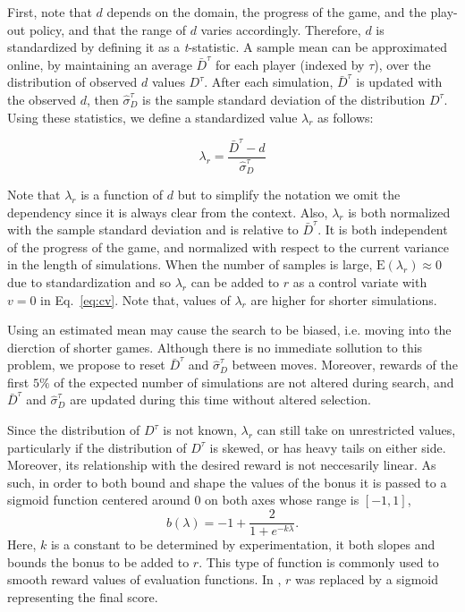 \documentclass{ecai2014}
\newcommand{\E}[1]{\mathrm{E}\left( #1 \right)}
\begin{document}
First, note that $d$ depends on the domain, the progress of the game, and the play-out policy, and that the range of $d$ varies accordingly. Therefore, $d$ is standardized by defining it as a \emph{t}-statistic. A sample mean can be approximated online, by maintaining an average $\bar{D}^\tau$ for each player (indexed by $\tau$), over the distribution of observed $d$ values $D^\tau$. After each simulation, $\bar{D}^\tau$ is updated with the observed $d$, then $\hat{\sigma}^\tau_D$ is the sample standard deviation of the distribution $D^\tau$. Using these statistics, we define a standardized value $\lambda_r$ as follows:

\begin{equation}
\lambda_r = \frac{\bar{D}^\tau - d}{\hat{\sigma}^\tau_D}
\label{eq:rb_norm}
\end{equation}

Note that $\lambda_r$ is a function of $d$ but to simplify the notation we omit the dependency since it is always clear from the context. Also, $\lambda_r$ is both normalized with the sample standard deviation and is relative to $\bar{D}^\tau$. It is both independent of the progress of the game, and normalized with respect to the current variance in the length of simulations. When the number of samples is large, $\E{\lambda_r} \approx 0$ due to standardization and so $\lambda_r$ can be added to $r$ as a control variate with $v = 0$ in Eq.~\ref{eq:cv}. Note that, values of $\lambda_r$ are higher for shorter simulations.

Using an estimated mean may cause the search to be biased, i.e. moving into the dierction of shorter games. Although there is no immediate sollution to this problem, we propose to reset $\bar{D}^\tau$ and $\hat{\sigma}^\tau_D$ between moves. Moreover, rewards of the first $5\%$ of the expected number of simulations are not altered during search, and $\bar{D}^\tau$ and $\hat{\sigma}^\tau_D$ are updated during this time without altered selection.

Since the distribution of $D^\tau$ is not known, $\lambda_r$ can still take on unrestricted values, particularly if the distribution of $D^\tau$ is skewed, or has heavy tails on either side. Moreover, its relationship with the desired reward is not neccesarily linear. As such, in order to both bound and shape the values of the bonus it is passed to a sigmoid function centered around $0$ on both axes whose range is $[-1,1]$,
\begin{equation}
b(\lambda)=-1+\frac{2}{1+e^{-k\lambda}}.
\label{eq:sigmoid}
\end{equation}
Here, $k$ is a constant to be determined by experimentation, it both slopes and bounds the bonus to be added to $r$. This type of function is commonly used to smooth reward values of evaluation functions. In \cite{shibahara2008combining}, $r$ was replaced by a sigmoid representing the final score.
\end{document}
